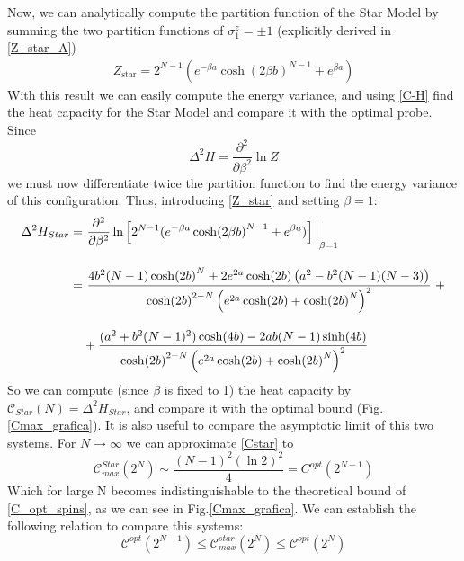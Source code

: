 Now, we can analytically compute the partition function of the Star Model by summing the two partition functions of $\sigma_1^z=\pm1$ (explicitly derived in \ref{Z_star_A})
\begin{align}
    Z_{\text{star}}=2^{N-1}(e^{-\beta a}\cosh(2\beta b )^{N-1}+e^{\beta a})
    \label{Z_star}
\end{align}
With this result we can easily compute the energy variance, and using \eqref{C-H} find the heat capacity for the Star Model and compare it with the optimal probe. Since
\begin{equation}
    \Delta^2 H=\frac{\partial^2}{\partial\beta^2}\ln Z
    \label{EnergyVariance}
\end{equation}
we must now differentiate twice the partition function to find the energy variance of this configuration. Thus, introducing \eqref{Z_star} and setting $\beta=1$:
\begin{align}
   \Delta^2 H_{Star} =&\,\, \frac{\partial^2}{\partial\beta^2} \ln\left[2^{N-1}(e^{-\beta a}\cosh(2\beta b )^{N-1}+e^{\beta a})\right]\bigg|_{\beta=1} \\[10pt]
   =&\,\,\frac{4b^2 (N-1) \cosh(2b)^N + 2e^{2a} \cosh(2b) \left( a^2 - b^2 (N-1)(N-3)\right)}{\cosh(2b)^{2-N} \left( e^{2a} \cosh(2b) + \cosh(2b)^N \right)^2}\,\,+\notag\\[10pt]
   &+ \frac{(a^2 + b^2 (N-1)^2) \cosh(4b) - 2ab(N-1) \sinh(4b)}{\cosh(2b)^{2-N} \left( e^{2a} \cosh(2b) + \cosh(2b)^N \right)^2}
   \label{Cstar}
\end{align}
So we can compute (since $\beta$ is fixed to 1) the heat capacity by $\mathcal{C}_{Star}(N)= \Delta^2 H_{Star}$, and compare it with the optimal bound (Fig.\ref{Cmax_grafica}). It is also useful to compare the asymptotic limit of this two systems. For $N\to \infty$ we can approximate \eqref{Cstar} to \cite{abiuso2022optimal}
\begin{equation}
    \mathcal{C}_{max}^{Star}(2^N) \sim \frac{(N-1)^2(\ln{2})^2}{4} = C^{opt}(2^{N-1})
\end{equation}
Which for large N becomes indistinguishable to the theoretical bound of \eqref{C_opt_spins}, as we can see in Fig.\ref{Cmax_grafica}. We can establish the following relation to compare this systems:
\begin{equation}
    \mathcal{C}^{opt}(2^{N-1})\leq \mathcal{C}^{star}_{max}(2^N)\leq \mathcal{C}^{opt}(2^{N})
\end{equation}

